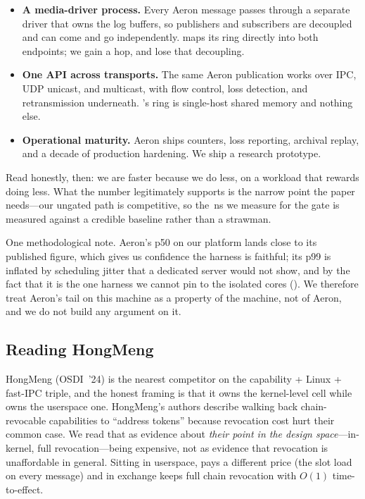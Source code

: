 \begin{itemize}
\itemsep0pt
\item \textbf{A media-driver process.} Every Aeron message passes
through a separate driver that owns the log buffers, so publishers
and subscribers are decoupled and can come and go independently.
\sysname maps its ring directly into both endpoints; we gain a hop,
and lose that decoupling.
\item \textbf{One API across transports.} The same Aeron publication
works over IPC, UDP unicast, and multicast, with flow control, loss
detection, and retransmission underneath. \sysname's ring is
single-host shared memory and nothing else.
\item \textbf{Operational maturity.} Aeron ships counters, loss
reporting, archival replay, and a decade of production hardening.
We ship a research prototype.
\end{itemize}

Read honestly, then: we are faster because we do less, on a workload
that rewards doing less. What the number legitimately supports is the
narrow point the paper needs---our ungated path is competitive, so
the \gateOverheadTail\,ns we measure for the gate is measured against
a credible baseline rather than a strawman.

One methodological note. Aeron's p50 on our platform lands close to
its published figure, which gives us confidence the harness is
faithful; its p99 is inflated by scheduling jitter that a dedicated
server would not show, and by the fact that it is the one harness we
cannot pin to the isolated cores (). We
therefore treat Aeron's tail on this machine as a property of the
machine, not of Aeron, and we do not build any argument on it.

\subsection{Reading HongMeng}
\label{sec:disc:hongmeng}

HongMeng (OSDI~'24) is the nearest competitor on the capability +
Linux + fast-IPC triple, and the honest framing is that it owns the
kernel-level cell while \sysname owns the userspace one. HongMeng's
authors describe walking back chain-revocable capabilities to
``address tokens'' because revocation cost hurt their common case. We
read that as evidence about \emph{their point in the design
space}---in-kernel, full revocation---being expensive, not as
evidence that revocation is unaffordable in general. Sitting in
userspace, \sysname pays a different price (the slot load on every
message) and in exchange keeps full chain revocation with $O(1)$
time-to-effect.

